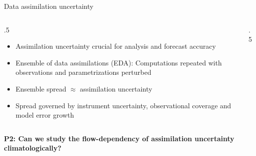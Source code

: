\documentclass[11pt,aspectratio=169]{beamer}
\begin{document}
\begin{frame}{Data assimilation uncertainty}
  \begin{columns}
    \begin{column}{.5\textwidth}
      \begin{itemize}
        \item Assimilation uncertainty crucial for analysis and forecast
        accuracy \pause
        \item Ensemble of data assimilations (EDA): Computations repeated with
        observations and
              parametrizations perturbed \pause
        \item Ensemble spread $\approx$ assimilation uncertainty \pause
        \item Spread governed by instrument uncertainty, observational
              coverage and model error growth
      \end{itemize}
    \end{column}
    \begin{column}{.5\textwidth}
      \centering
      \resizebox{\linewidth}{!}{\dacyclefigure}
    \end{column}
  \end{columns}
\end{frame}


\begin{frame}{}
  \centering
  \Huge
  \textbf{P2: Can we study the flow-dependency of assimilation uncertainty climatologically?}
\end{frame}

%
%
\end{document}
